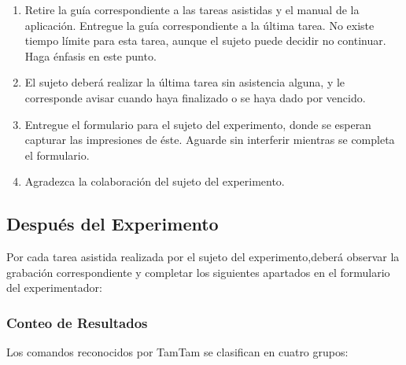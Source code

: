 \begin{enumerate}
    \item Retire la gu\'ia correspondiente a las tareas asistidas y el manual de la aplicaci\'on. Entregue la gu\'ia correspondiente a la \'ultima tarea. No existe tiempo l\'imite para esta tarea, aunque el sujeto puede decidir no continuar. Haga \'enfasis en este punto.
    \item El sujeto deber\'a realizar la \'ultima tarea  sin asistencia alguna, y le corresponde avisar cuando haya finalizado o se haya dado por vencido.
    \item Entregue el formulario para el sujeto del experimento, donde se esperan capturar las impresiones de \'este. Aguarde sin interferir mientras se completa el formulario.
    \item Agradezca la colaboraci\'on del sujeto del experimento.
\end{enumerate}


\subsection{Despu\'es del Experimento}

 Por cada tarea asistida realizada por el sujeto del experimento,deber\'a observar la grabaci\'on correspondiente y completar los siguientes apartados en el formulario del experimentador:

\subsubsection{Conteo de Resultados}

 Los comandos reconocidos por TamTam se clasifican en cuatro grupos:

